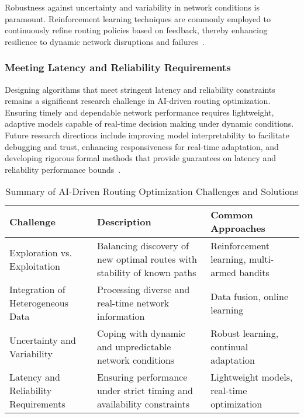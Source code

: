 \documentclass[sigconf]{acmart}
\begin{document}
Robustness against uncertainty and variability in network conditions is paramount. Reinforcement learning techniques are commonly employed to continuously refine routing policies based on feedback, thereby enhancing resilience to dynamic network disruptions and failures~\cite{}.

\subsubsection{Meeting Latency and Reliability Requirements}

Designing algorithms that meet stringent latency and reliability constraints remains a significant research challenge in AI-driven routing optimization. Ensuring timely and dependable network performance requires lightweight, adaptive models capable of real-time decision making under dynamic conditions. Future research directions include improving model interpretability to facilitate debugging and trust, enhancing responsiveness for real-time adaptation, and developing rigorous formal methods that provide guarantees on latency and reliability performance bounds~\cite{}.

\begin{table*}[htbp]
\centering
\caption{Summary of AI-Driven Routing Optimization Challenges and Solutions}
\label{tab:ai_routing_challenges}
\begin{adjustbox}{max width=\textwidth}
\begin{tabular}{@{}lll@{}}
\toprule
\textbf{Challenge}                         & \textbf{Description}                                                      & \textbf{Common Approaches}                     \\ \midrule
Exploration vs. Exploitation               & Balancing discovery of new optimal routes with stability of known paths  & Reinforcement learning, multi-armed bandits   \\
Integration of Heterogeneous Data          & Processing diverse and real-time network information                      & Data fusion, online learning                    \\
Uncertainty and Variability                & Coping with dynamic and unpredictable network conditions                  & Robust learning, continual adaptation           \\
Latency and Reliability Requirements       & Ensuring performance under strict timing and availability constraints    & Lightweight models, real-time optimization      \\ \bottomrule
\end{tabular}
\end{adjustbox}
\end{table*}
\end{document}

